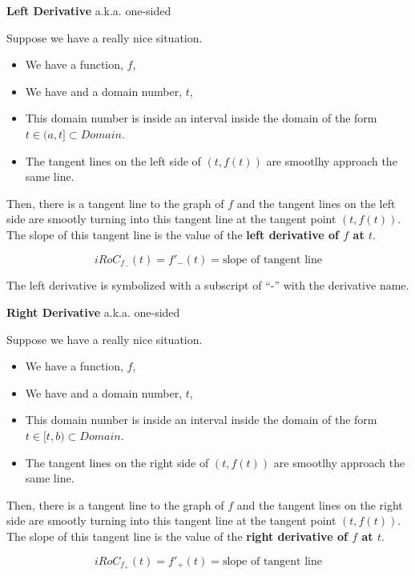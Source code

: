 \documentclass{ximera}
\begin{document}
\begin{definition} \textbf{\textcolor{green!50!black}{Left Derivative}}  a.k.a. one-sided 


Suppose we have a really nice situation.


\begin{itemize}
\item We have a function, $f$, 
\item We have and a domain number, $t$, 
\item This domain number is inside an  interval inside the domain of the form  $t \in (a, t] \subset Domain$. 
\item The tangent lines on the left side of $(t, f(t))$ are smootlhy approach the same line.
\end{itemize}

Then, there is a tangent line to the graph of $f$ and the tangent lines on the left side are smootly turning into this tangent line at the tangent point $(t, f(t))$. \\

The slope of this tangent line is the value of the \textbf{left derivative of $f$ at $t$}.

\[
iRoC_{f_{-}}(t) =f'_{-}(t) = \text{slope of tangent line}
\]


 

\end{definition}
The left derivative is symbolized with a subscript of ``-'' with the derivative name. \\





\begin{definition} \textbf{\textcolor{green!50!black}{Right Derivative}}  a.k.a. one-sided 


Suppose we have a really nice situation.


\begin{itemize}
\item We have a function, $f$, 
\item We have and a domain number, $t$, 
\item This domain number is inside an  interval inside the domain of the form  $t \in [t, b) \subset Domain$. 
\item The tangent lines on the right side of $(t, f(t))$ are smootlhy approach the same line.
\end{itemize}

Then, there is a tangent line to the graph of $f$ and the tangent lines on the right side are smootly turning into this tangent line at the tangent point $(t, f(t))$. \\

The slope of this tangent line is the value of the \textbf{right derivative of $f$ at $t$}.

\[
iRoC_{f_{+}}(t) =f'_{+}(t) = \text{slope of tangent line}
\]


 

\end{definition}
\end{document}
